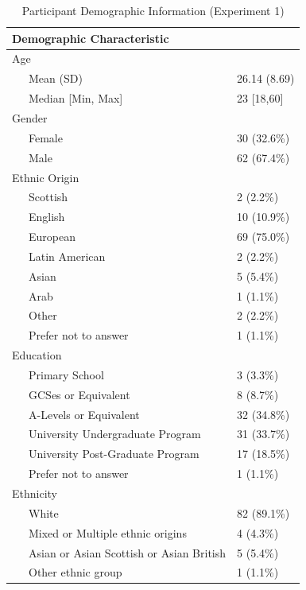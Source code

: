 \documentclass[
  donotrepeattitle,doc, 12pt, a4paper,floatsintext]{apa7}
\begin{document}
\begin{table}[tbp]

\begin{center}
\begin{threeparttable}

\caption{\label{tab:table1}Participant Demographic Information (Experiment 1)}

\begin{tabular}{ll}
\toprule
Demographic Characteristic & \\
\midrule
Age & \\
\ \ \ Mean (SD) & 26.14 (8.69)\\
\ \ \ Median [Min, Max] & 23 [18,60]\\
Gender & \\
\ \ \ Female & 30 (32.6\%)\\
\ \ \ Male & 62 (67.4\%)\\
Ethnic Origin & \\
\ \ \ Scottish & 2 (2.2\%)\\
\ \ \ English & 10 (10.9\%)\\
\ \ \ European & 69 (75.0\%)\\
\ \ \ Latin American & 2 (2.2\%)\\
\ \ \ Asian & 5 (5.4\%)\\
\ \ \ Arab & 1 (1.1\%)\\
\ \ \ Other & 2 (2.2\%)\\
\ \ \ Prefer not to answer & 1 (1.1\%)\\
Education & \\
\ \ \ Primary School & 3 (3.3\%)\\
\ \ \ GCSes or Equivalent & 8 (8.7\%)\\
\ \ \ A-Levels or Equivalent & 32 (34.8\%)\\
\ \ \ University Undergraduate Program & 31 (33.7\%)\\
\ \ \ University Post-Graduate Program & 17 (18.5\%)\\
\ \ \ Prefer not to answer & 1 (1.1\%)\\
Ethnicity & \\
\ \ \ White & 82 (89.1\%)\\
\ \ \ Mixed or Multiple ethnic origins & 4 (4.3\%)\\
\ \ \ Asian or Asian Scottish or Asian British & 5 (5.4\%)\\
\ \ \ Other ethnic group & 1 (1.1\%)\\
\bottomrule
\end{tabular}

\end{threeparttable}
\end{center}

\end{table}
\end{document}
